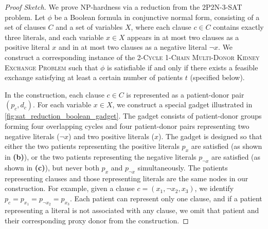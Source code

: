 \begin{proof}[Proof Sketch]
We prove NP-hardness via a reduction from the \textsc{2P2N-3-SAT} problem. Let $\phi$ be a Boolean formula in conjunctive normal form, consisting of a set of clauses $C$ and a set of variables $X$, where each clause $c \in C$ contains exactly three literals, and each variable $x \in X$ appears in at most two clauses as a positive literal $x$ and in at most two clauses as a negative literal $\neg{x}$. We construct a corresponding instance of the \textsc{2-Cycle 1-Chain Multi-Donor Kidney Exchange Problem} such that $\phi$ is satisfiable if and only if there exists a feasible exchange satisfying at least a certain number of patients $t$ (specified below).

In the construction, each clause $c \in C$ is represented as a patient-donor pair $(p_c, d_c)$. For each variable $x \in X$, we construct a special gadget illustrated in \autoref{fig:sat_reduction_boolean_gadget}. The gadget consists of patient-donor groups forming four overlapping cycles and four patient-donor pairs representing two negative literals ($\neg{x}$) and two positive literals ($x$). The gadget is designed so that either the two patients representing the positive literals $p_x$ are satisfied (as shown in \textbf{(b)}), or the two patients representing the negative literals $p_{\neg{x}}$ are satisfied (as shown in \textbf{(c)}), but never both $p_x$ and $p_{\neg{x}}$ simultaneously. The patients representing clauses and those representing literals are the same nodes in our construction. For example, given a clause $c = (x_1, \neg{x_2}, x_3)$, we identify $p_c = p_{x_1} = p_{\neg{x_2}} = p_{x_3}$. Each patient can represent only one clause, and if a patient representing a literal is not associated with any clause, we omit that patient and their corresponding proxy donor from the construction.



\end{proof}
